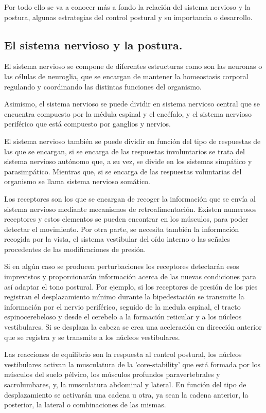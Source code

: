 Por todo ello se va a conocer más a fondo la relación del sistema nervioso y la postura, algunas estrategias del control postural y su importancia o desarrollo.

\subsection{El sistema nervioso y la postura.} 
El sistema nervioso se compone de diferentes estructuras como son las neuronas o las células de neuroglia, que se encargan de mantener la homeostasis corporal regulando y coordinando las distintas funciones del organismo.

Asimismo, el sistema nervioso se puede dividir en sistema nervioso central que se encuentra compuesto por la médula espinal y el encéfalo, y el sistema nervioso periférico que está compuesto por ganglios y nervios.

El sistema nervioso también se puede dividir en función del tipo de respuestas de las que se encargan, si se encarga de las respuestas involuntarios se trata del sistema nervioso autónomo que, a su vez, se divide en los sistemas simpático y parasimpático. Mientras que, si se encarga de las respuestas voluntarias del organismo se llama sistema nervioso somático.

Los receptores son los que se encargan de recoger la información que se envía al sistema nervioso mediante mecanismos de retroalimentación. Existen numerosos receptores y estos elementos se pueden encontrar en los músculos, para poder detectar el movimiento. Por otra parte, se necesita también la información recogida por la vista, el sistema vestibular del oído interno o las señales procedentes de las modificaciones de presión.

Si en algún caso se producen perturbaciones los receptores detectarán esos imprevistos y proporcionarán información acerca de las nuevas condiciones para así adaptar el tono postural. Por ejemplo, si los receptores de presión de los pies registran el desplazamiento mínimo durante la bipedestación se transmite la información por el nervio periférico, seguido de la medula espinal, el tracto espinocerebeloso y desde el cerebelo a la formación reticular y a los núcleos vestibulares. Si se desplaza la cabeza se crea una aceleración en dirección anterior que se registra y se transmite a los núcleos vestibulares. 

Las reacciones de equilibrio son la respuesta al control postural, los núcleos vestibulares activan la musculatura de la 'core-stability' que está formada por los músculos del suelo pélvico, los músculos profundos paravertebrales y sacrolumbares, y, la musculatura abdominal y lateral. En función del tipo de desplazamiento se activarán una cadena u otra, ya sean la cadena anterior, la posterior, la lateral o combinaciones de las mismas.

